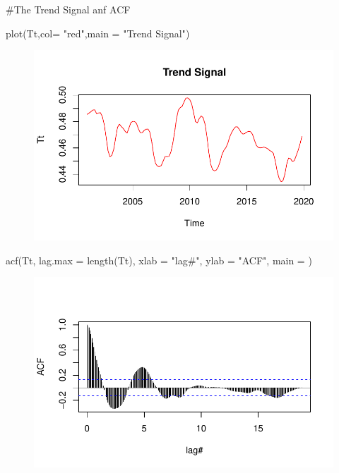 \documentclass[
  letterpaper,
  DIV=11,
  numbers=noendperiod]{scrartcl}
\newenvironment{Shaded}{\begin{snugshade}}{\end{snugshade}}
\newcommand{\AttributeTok}[1]{\textcolor[rgb]{0.40,0.45,0.13}{#1}}
\newcommand{\CommentTok}[1]{\textcolor[rgb]{0.37,0.37,0.37}{#1}}
\newcommand{\FunctionTok}[1]{\textcolor[rgb]{0.28,0.35,0.67}{#1}}
\newcommand{\NormalTok}[1]{\textcolor[rgb]{0.00,0.23,0.31}{#1}}
\newcommand{\StringTok}[1]{\textcolor[rgb]{0.13,0.47,0.30}{#1}}
\begin{document}
\begin{Shaded}
\begin{Highlighting}[]
\CommentTok{\#The Trend Signal anf ACF}

\FunctionTok{plot}\NormalTok{(Tt,}\AttributeTok{col=} \StringTok{"red"}\NormalTok{,}\AttributeTok{main =} \StringTok{"Trend Signal"}\NormalTok{)}
\end{Highlighting}
\end{Shaded}

\begin{figure}[H]

{\centering \includegraphics{Quarto_files/figure-pdf/unnamed-chunk-17-3.pdf}

}

\end{figure}

\begin{Shaded}
\begin{Highlighting}[]
\FunctionTok{acf}\NormalTok{(Tt, }\AttributeTok{lag.max =} \FunctionTok{length}\NormalTok{(Tt),}
    \AttributeTok{xlab =} \StringTok{"lag\#"}\NormalTok{, }\AttributeTok{ylab =} \StringTok{"ACF"}\NormalTok{, }\AttributeTok{main =} \StringTok{\textquotesingle{}\textquotesingle{}}\NormalTok{)}
\end{Highlighting}
\end{Shaded}

\begin{figure}[H]

{\centering \includegraphics{Quarto_files/figure-pdf/unnamed-chunk-17-4.pdf}

}

\end{figure}
\end{document}
